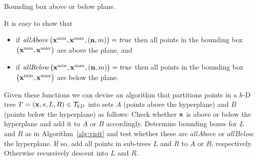 \begin{algorithm}[h]
  \DontPrintSemicolon
  \BlankLine
  \BlankLine
  \caption{Bounding box above or below plane.}
  \label{alg:abovebelow}
\end{algorithm}

It is easy to show that
\begin{itemize}
  \item if $\mathit{allAbove} \left( \mathbf{x}^{\operatorname{min}}, \mathbf{x}^{\operatorname{max}}, \left( \mathbf{n}, m \right) \right) = \mathit{true}$
        then all points in the bounding box $\left( \mathbf{x}^{\operatorname{min}}, \mathbf{x}^{\operatorname{max}} \right)$ are above the plane, and
  \item if $\mathit{allBelow} \left( \mathbf{x}^{\operatorname{min}}, \mathbf{x}^{\operatorname{max}}, \left( \mathbf{n}, m \right) \right) = \mathit{true}$
        then all points in the bounding box $\left( \mathbf{x}^{\operatorname{min}}, \mathbf{x}^{\operatorname{max}} \right)$ are below the plane.
\end{itemize}

Given these functions we can devise an algorithm that partitions points in a $k$-D tree $T = \left( \mathbf{x}, s, L, R \right) \in \mathcal{T}_{kD}$
  into sets $A$ (points above the hyperplane)
  and $B$ (points below the hyperplane) as follows:
Check whether $\mathbf{x}$ is above or below the hyperplane and add it to $A$ or $B$ accordingly.
Determine bounding boxes for $L$ and $R$ as in Algorithm~\ref{alg:visit}
  and test whether these are $\mathit{allAbove}$ or $\mathit{allBelow}$ the hyperplane.
If so, add all points in sub-trees $L$ and $R$ to $A$ or $B$, respectively.
Otherwise recursively descent into $L$ and $R$.

